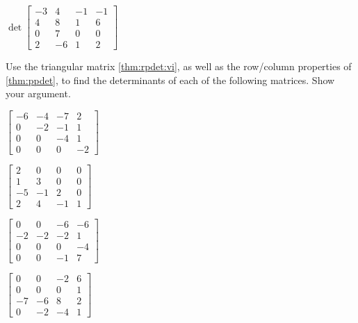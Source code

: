 \begin{exercise}
\begin{parts}
\item \(\det\begin{bmatrix} -3 & 4 & -1 & -1
\\4 & 8 & 1 & 6
\\0 & 7 & 0 & 0
\\2 & -6 & 1 & 2 \end{bmatrix}\)

\end{parts}
\end{exercise}




\begin{exercise} \label{ex:} 
Use the triangular matrix \autoref{thm:rpdet:vi}, as well as the row\slash column properties of \autoref{thm:ppdet}, to find the determinants of each of the following matrices.
Show your argument.
\begin{parts}
\item \(\begin{bmatrix} -6 & -4 & -7 & 2
\\0 & -2 & -1 & 1
\\0 & 0 & -4 & 1
\\0 & 0 & 0 & -2 \end{bmatrix}\)

\item \(\begin{bmatrix} 2 & 0 & 0 & 0
\\1 & 3 & 0 & 0
\\-5 & -1 & 2 & 0
\\2 & 4 & -1 & 1 \end{bmatrix}\)

\item \(\begin{bmatrix} 0 & 0 & -6 & -6
\\-2 & -2 & -2 & 1
\\0 & 0 & 0 & -4
\\0 & 0 & -1 & 7 \end{bmatrix}\)

\item \(\begin{bmatrix} 0 & 0 & -2 & 6
\\0 & 0 & 0 & 1
\\-7 & -6 & 8 & 2
\\0 & -2 & -4 & 1 \end{bmatrix}\)


\end{parts}
\end{exercise}
